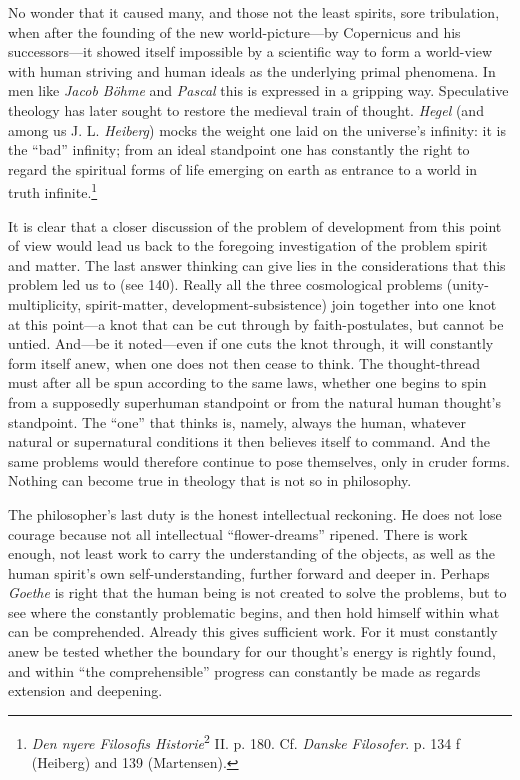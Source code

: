 \documentclass[12pt,a4paper]{book}
\newcommand{\opage}[1]{\marginnote{\footnotesize\textit{[#1]}}}
\begin{document}
\opage{343}No wonder that it caused many, and those not the least spirits, sore tribulation, when after the founding
of the new world-picture---by Copernicus and his successors---it showed itself impossible by a scientific
way to form a world-view with human striving and human ideals as the underlying primal phenomena. In men
like \emph{Jacob Böhme} and \emph{Pascal} this is expressed in a gripping way. Speculative theology has
later sought to restore the medieval train of thought. \emph{Hegel} (and among us J. L. \emph{Heiberg})
mocks the weight one laid on the universe's infinity: it is the ``bad'' infinity; from an ideal standpoint
one has constantly the right to regard the spiritual forms of life emerging on earth as entrance to a
world in truth infinite.\footnote{\emph{Den nyere Filosofis Historie}\textsuperscript{2} II. p. 180. Cf.
\emph{Danske Filosofer}. p. 134 f (Heiberg) and 139 (Martensen).}

It is clear that a closer discussion of the problem of development from this point of view would lead us
back to the foregoing investigation of the problem spirit and matter. The last answer thinking can give
lies in the considerations that this problem led us to (see 140). Really all the three cosmological
problems (unity-multiplicity, spirit-matter, development-subsistence) join together into one knot at this
point---a knot that can be cut through by faith-postulates, but cannot be untied. And---be it noted---even
if one cuts the knot through, it will constantly form itself anew, when one does not then cease to think.
The thought-thread must after all be spun according to the same laws, whether one begins to spin from a
supposedly superhuman standpoint or from the natural human thought's standpoint. The ``one'' that thinks
is, namely, always the human, whatever natural or supernatural conditions it then believes itself to
command. And the same problems would therefore continue to pose themselves, only in cruder forms. Nothing
can become true in theology that is not so in philosophy.

The philosopher's last duty is the honest intellectual reckoning. He does not lose courage because not all
intellectual ``\opage{344}flower-dreams'' ripened. There is work enough, not least work to carry the understanding of
the objects, as well as the human spirit's own self-understanding, further forward and deeper in. Perhaps
\emph{Goethe} is right that the human being is not created to solve the problems, but to see where the
constantly problematic begins, and then hold himself within what can be comprehended. Already this gives
sufficient work. For it must constantly anew be tested whether the boundary for our thought's energy is
rightly found, and within ``the comprehensible'' progress can constantly be made as regards extension and
deepening.
\end{document}
